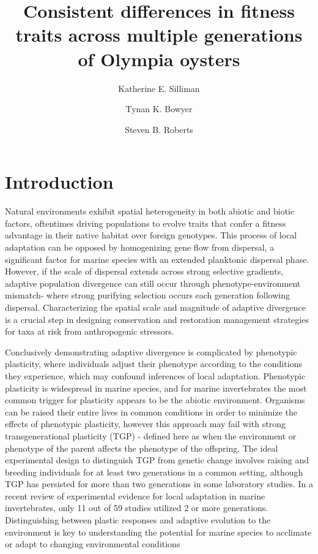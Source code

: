 \documentclass[fleqn,10pt]{wlscirep}
\title{Consistent differences in fitness traits across multiple generations of Olympia oysters}
\author[1,*]{Katherine E. Silliman}
\author[1]{Tynan K. Bowyer}
\author[2]{Steven B. Roberts}
\affil[1]{University of Chicago, Ecology and Evolution, Chicago, 60637, United States}
\affil[2]{University of Washington, School of Aquatic and Fishery Sciences, Seattle, 98195, United States}
\affil[*]{ksilliman@uchicago.edu}
\begin{document}
\flushbottom
\maketitle
\thispagestyle{empty}

\section*{Introduction}

Natural environments exhibit spatial heterogeneity in both abiotic and biotic factors, oftentimes driving populations to evolve traits that confer a fitness advantage in their native habitat over foreign genotypes\cite{Kawecki2004-qo}. This process of local adaptation can be opposed by homogenizing gene flow from dispersal, a significant factor for marine species with an extended planktonic dispersal phase\cite{Grosberg2001-tv}. However, if the scale of dispersal extends across strong selective gradients, adaptive population divergence can still occur through phenotype-environment mismatch- where strong purifying selection occurs each generation following dispersal\cite{Marshall2010-lc,Schmidt2001-ex}. Characterizing the spatial scale and magnitude of adaptive divergence is a crucial step in designing conservation and restoration management strategies for taxa at risk from anthropogenic stressors\cite{Baums2008-od,Carroll2014-ts}.\par
Conclusively demonstrating adaptive divergence is complicated by phenotypic plasticity, where individuals adjust their phenotype according to the conditions they experience\cite{West-Eberhard2003-ja}, which may confound inferences of local adaptation\cite{Kawecki2004-qo,Teplitsky2008-fe}. Phenotypic plasticity is widespread in marine species\cite{Conover2006-tk,Pepin1991-ja,Padilla2013-th}, and for marine invertebrates the most common trigger for plasticity appears to be the abiotic environment\cite{Padilla2013-th}. Organisms can be raised their entire lives in common conditions in order to minimize the effects of phenotypic plasticity, however this approach may fail with strong transgenerational plasticity (TGP) - defined here as when the environment or phenotype of the parent affects the phenotype of the offspring\cite{Kawecki2004-qo,Guillaume2016-vu}. The ideal experimental design to distinguish TGP from genetic change involves raising and breeding individuals for at least two generations in a common setting\cite{Kawecki2004-qo}, although TGP has persisted for more than two generations in some laboratory studies\cite{Hercus2000-ai}. In a recent review of experimental evidence for local adaptation in marine invertebrates, only 11 out of 59 studies utilized 2 or more generations\cite{Sanford2011-fy}. Distinguishing between plastic responses and adaptive evolution to the environment is key to understanding the potential for marine species to acclimate or adapt to changing environmental conditions\cite{Salinas2013-ry}\par
\end{document}
